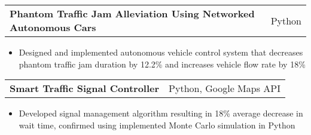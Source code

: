 \documentclass[letterpaper,11pt]{article}
\makeatletter
\newcommand{\resitem}[1]{\item[--] #1}
\newcommand{\ressubheading}[4]{
	\begin{tabular*}{7.5in}{l@{\extracolsep{\fill}}r}
			\textbf{#1} & #2 \\
			\textit{#3} & \textit{#4}
	\end{tabular*}
}
\newcommand{\projsubheading}[2]{
	\begin{tabular*}{7.5in}{l@{\extracolsep{\fill}}r}
		\textbf{#1} & #2
	\end{tabular*}
}
\makeatother
\begin{document}
\projsubheading{Phantom Traffic Jam Alleviation Using Networked Autonomous Cars}
			   {Python}
\begin{itemize}
	\resitem{
		Designed and implemented autonomous vehicle control system that
		decreases phantom traffic jam duration by 12.2\% and increases vehicle
		flow rate by 18\%
	}
\end{itemize}

\projsubheading{Smart Traffic Signal Controller}
			   {Python, Google Maps API}
\begin{itemize}
	\resitem{
		Developed signal management algorithm resulting in 18\% average
		decrease in wait time, confirmed using implemented Monte Carlo
		simulation in Python
	}
\end{itemize}


\end{document}
